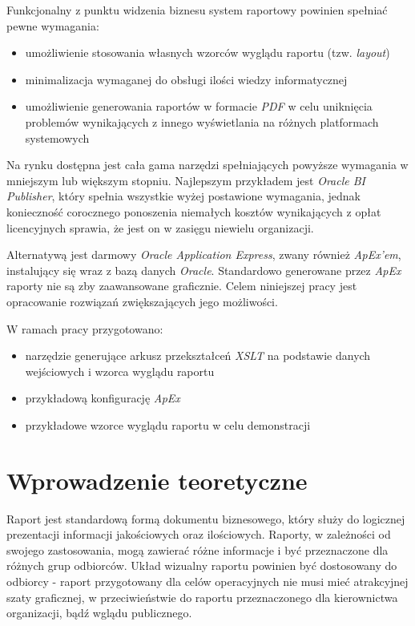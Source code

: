 \documentclass[11pt,a4paper]{article}
\begin{document}
Funkcjonalny z punktu widzenia biznesu system raportowy powinien spełniać pewne wymagania:
\begin{itemize}
	\item umożliwienie stosowania własnych wzorców wyglądu raportu (tzw. \emph{layout})
	\item minimalizacja wymaganej do obsługi ilości wiedzy informatycznej 
	\item umożliwienie generowania raportów w formacie \emph{PDF} w celu uniknięcia problemów wynikających z innego wyświetlania na różnych platformach systemowych
\end{itemize}

Na rynku dostępna jest cała gama narzędzi spełniających powyższe wymagania w mniejszym lub większym stopniu. Najlepszym przykładem jest \emph{Oracle BI Publisher}, który spełnia wszystkie wyżej postawione wymagania, jednak konieczność corocznego ponoszenia niemałych kosztów wynikających z opłat licencyjnych sprawia, że jest on w zasięgu niewielu organizacji.

Alternatywą jest darmowy \emph{Oracle Application Express}, zwany również \emph{ApEx'em}, instalujący się wraz z bazą danych \emph{Oracle}. Standardowo generowane przez \emph{ApEx} raporty nie są zby zaawansowane graficznie. Celem niniejszej pracy jest opracowanie rozwiązań zwiększających jego możliwości.

W ramach pracy przygotowano:
\begin{itemize}
	\item narzędzie generujące arkusz przekształceń \emph{XSLT} na podstawie danych wejściowych i wzorca wyglądu raportu
	\item przykładową konfigurację \emph{ApEx}
	\item przykładowe wzorce wyglądu raportu w celu demonstracji
\end{itemize}


\newpage

\section{Wprowadzenie teoretyczne} \label{sec:teoria}
Raport jest standardową formą dokumentu biznesowego, który służy do logicznej prezentacji informacji jakościowych oraz ilościowych.
 Raporty, w zależności od swojego zastosowania, mogą zawierać różne informacje i być przeznaczone dla różnych grup odbiorców. Układ wizualny raportu powinien być dostosowany do odbiorcy - raport przygotowany dla celów operacyjnych nie musi mieć atrakcyjnej szaty graficznej, w przeciwieństwie do raportu przeznaczonego dla kierownictwa organizacji, bądź wglądu publicznego. 
\end{document}
